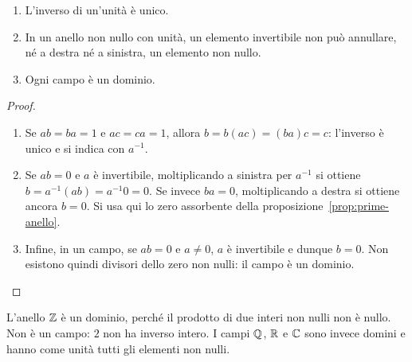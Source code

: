 \begin{proposizione}
\begin{enumerate}[label=\arabic*.]
\item L'inverso di un'unità è unico.
\item In un anello non nullo con unità, un elemento invertibile non può annullare, né a destra né a sinistra, un elemento non nullo.
\item Ogni campo è un dominio.
\end{enumerate}
\end{proposizione}
\begin{proof}
\begin{enumerate}[label=\arabic*.]
\item Se $ab=ba=1$ e $ac=ca=1$, allora $b=b(ac)=(ba)c=c$: l'inverso è unico e si indica con $a^{-1}$.
\item Se $ab=0$ e $a$ è invertibile, moltiplicando a sinistra per $a^{-1}$ si ottiene $b=a^{-1}(ab)=a^{-1}0=0$. Se invece $ba=0$, moltiplicando a destra si ottiene ancora $b=0$. Si usa qui lo zero assorbente della proposizione~\ref{prop:prime-anello}.
\item Infine, in un campo, se $ab=0$ e $a\ne0$, $a$ è invertibile e dunque $b=0$. Non esistono quindi divisori dello zero non nulli: il campo è un dominio.
\end{enumerate}
\end{proof}

\begin{esempio}
L'anello $\mathbb{Z}$ è un dominio, perché il prodotto di due interi non nulli non è nullo. Non è un campo: $2$ non ha inverso intero. I campi $\mathbb{Q}$, $\mathbb{R}$ e $\mathbb{C}$ sono invece domini e hanno come unità tutti gli elementi non nulli.
\end{esempio}

